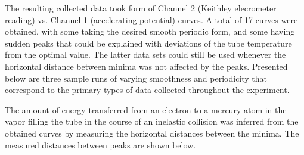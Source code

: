 \begin{paper}
	
	The resulting collected data took form of Channel 2 (Keithley elecrometer reading) vs. Channel 1 (accelerating potential) curves. A total of 17 curves were obtained, with some taking the desired smooth periodic form, and some having sudden peaks that could be explained with deviations of the tube temperature from the optimal value. The latter data sets could still be used whenever the horizontal distance between minima was not affected by the peaks. Presented below are three sample runs of varying smoothness and periodicity that correspond to the primary types of data collected throughout the experiment.  
	
	
	
	
	The amount of energy transferred from an electron to a mercury atom in the vapor filling the tube in the course of an inelastic collision was inferred from the obtained curves by measuring the horizontal distances between the minima. The measured distances between peaks are shown below. \vspace{1em}
	

\end{paper}
